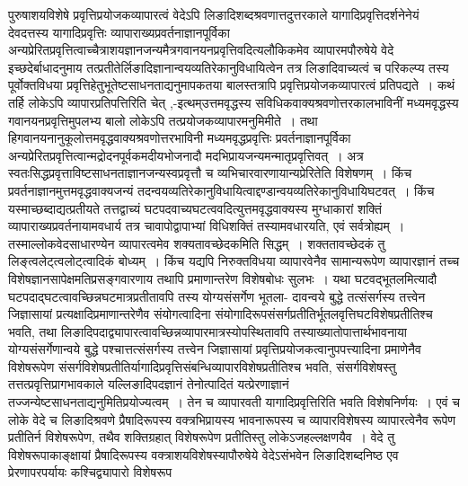 \documentclass[11pt, openany]{book}
\makeatletter
\def\blfootnote{\gdef\@thefnmark{}\@footnotetext}
\makeatother
\begin{document}
पुरुषाशयविशेषे प्रवृत्तिप्रयोजकव्यापारत्वं वेदेऽपि लिङादिशब्दश्रवणात्तदुत्तरकाले यागादिप्रवृत्तिदर्शनेनेयं देवदत्तस्य यागादिप्रवृत्तिः व्यापाराख्यप्रवर्तनाज्ञानपूर्विका
अन्यप्रेरितप्रवृत्तित्वाच्चैत्राशयज्ञानजन्यमैत्रगवानयनप्रवृत्तिवदित्यलौकिकमेव व्यापारमपौरुषेये वेदे इच्छदेर्बाधादनुमाय तत्प्रतीतेर्लिङादिज्ञानान्वयव्यतिरेकानुविधायित्वेन तत्र लिङादिवाच्यत्वं च परिकल्प्य तस्य पूर्वोक्तविधया प्रवृत्तिहेतुभूतेष्टसाधनताद्यनुमापकतया बालस्तत्रापि प्रवृत्तिप्रयोजकव्यापारत्वं प्रतिपद्यते~। कथं तर्हि लोकेऽपि
व्यापारप्रतिपत्तिरिति चेत् ,-इत्थम्\textendash उत्तमवृद्धस्य सविधिकवाक्यश्रवणोत्तरकालभाविनीं मध्यमवृद्धस्य गवानयनप्रवृत्तिमुपलभ्य बालो लोकेऽपि तत्प्रयोजकव्यापारमनुमिमीते~। तथा हि\textendash गवानयनानुकूलोत्तमवृद्धवाक्यश्रवणोत्तरभाविनी मध्यमवृद्धप्रवृत्तिः प्रवर्तनाज्ञानपूर्विका अन्यप्रेरितप्रवृत्तित्वान्मद्रोदनपूर्वकमदीयभोजनादौ मदभिप्रायजन्यमन्मातृप्रवृत्तिवत्~। अत्र स्वतःसिद्धप्रवृत्ताविष्टसाधनताज्ञानजन्यस्वप्रवृत्तौ च व्यभिचारवारणायान्यप्रेरितेति विशेषणम्~। किंच प्रवर्तनाज्ञानमुत्तमवृद्धवाक्यजन्यं तदन्वयव्यतिरेकानुविधायित्वाद्दण्डान्वयव्यतिरेकानुविधायिघटवत्~। किंच यस्माच्छब्दाद्यत्प्रतीयते तत्तद्वाच्यं
घटपदवाच्यघटत्ववदित्युत्तमवृद्धवाक्यस्य मुग्धाकारां शक्तिं व्यापाराख्यप्रवर्तनायामवधार्य तत्र चावापोद्वापाभ्यां विधिशक्तिं तस्यामवधारयति, एवं सर्वत्रोह्यम्~। तस्माल्लोकवेदसाधारण्येन व्यापारत्वमेव शक्यतावच्छेदकमिति सिद्धम्~। शक्ततावच्छेदकं तु लिङ्त्वलेट्त्वलोट्त्वादिकं बोध्यम्~। किंच यद्यपि निरुक्तविधया व्यापारवेनैव सामान्यरूपेण व्यापारज्ञानं तच्च विशेषज्ञानसापेक्षमतिप्रसङ्गवारणाय तथापि प्रमाणान्तरेण विशेषबोधः सुलभः~। यथा घटवद्भूतलमित्यादौ घटपदाद्घटत्वावच्छिन्नघटमात्रप्रतीतावपि तस्य योग्यसंसर्गेण भूतला- 
\blfootnote{पाठा०\textemdash\ $^{१}${\qt ०पदे यस्याप्येतत्}}
\newpage
\fancyhead[RE]{[ शाब्द्या लौकिक\textemdash\ }
\noindent
दावन्वये बुद्धे तत्संसर्गस्य तत्त्वेन जिज्ञासायां प्रत्यक्षादिप्रमाणान्तरेणैव संयोगत्वादिना संयोगादिरूपसंसर्गप्रतीतिर्भूतलवृत्तिघटविशेषप्रतीतिश्च भवति, तथा
लिङादिपदाद्व्यापारत्वावच्छिन्नव्यापारमात्रस्योपस्थितावपि तस्याख्यातोपात्तार्थभावनाया योग्यसंसर्गेणान्वये बुद्धे पश्चात्तत्संसर्गस्य तत्त्वेन जिज्ञासायां प्रवृत्तिप्रयोजकत्वानुपपत्त्यादिना प्रमाणेनैव विशेषरूपेण संसर्गविशेषप्रतीतिर्यागादिप्रवृत्तिसंबन्धिव्यापारविशेषप्रतीतिश्च भवति, संसर्गविशेषस्तु तत्तत्प्रवृत्तिप्रागभावकाले यल्लिङादिपदज्ञानं तेनोत्पादितं यत्प्रेरणाज्ञानं तज्जन्येष्टसाधनताद्यनुमितिप्रयोज्यत्वम्~। तेन च व्यापारवती यागादिप्रवृत्तिरिति भवति विशेषनिर्णयः~। एवं च लोके वेदे
च लिङादिश्रवणे प्रैषादिरूपस्य वक्त्रभिप्रायस्य भावनारूपस्य च व्यापारविशेषस्य व्यापारत्वेनैव रूपेण प्रतीतिर्न विशेषरूपेण, तथैव शक्तिग्रहात् विशेषरूपेण प्रतीतिस्तु लोकेऽजहल्लक्षणयैव~। वेदे तु विशेषरूपाकाङ्क्षायां प्रैषादिरूपस्य वक्त्राशयविशेषस्यापौरुषेये वेदेऽसंभवेन लिङादिशब्दनिष्ठ एव प्रेरणापरपर्यायः कश्चिद्व्यापारो विशेषरूप
\end{document}
